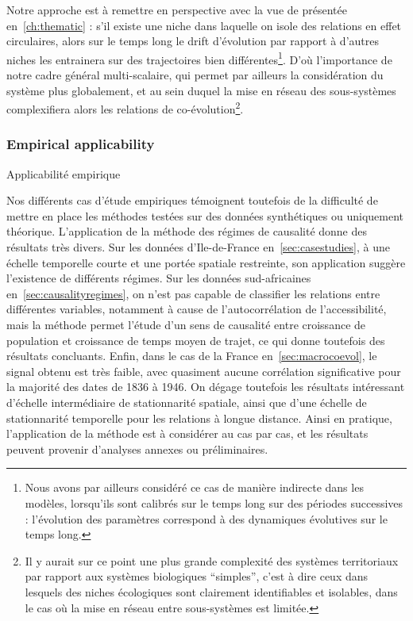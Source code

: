 Notre approche est à remettre en perspective avec la vue de  présentée en~\ref{ch:thematic} : s'il existe une niche dans laquelle on isole des relations en effet circulaires, alors sur le temps long le drift d'évolution par rapport à d'autres niches les entrainera sur des trajectoires bien différentes\footnote{Nous avons par ailleurs considéré ce cas de manière indirecte dans les modèles, lorsqu'ils sont calibrés sur le temps long sur des périodes successives : l'évolution des paramètres correspond à des dynamiques évolutives sur le temps long.}. D'où l'importance de notre cadre général multi-scalaire, qui permet par ailleurs la considération du système plus globalement, et au sein duquel la mise en réseau des sous-systèmes complexifiera alors les relations de co-évolution\footnote{Il y aurait sur ce point une plus grande complexité des systèmes territoriaux par rapport aux systèmes biologiques ``simples'', c'est à dire ceux dans lesquels des niches écologiques sont clairement identifiables et isolables, dans le cas où la mise en réseau entre sous-systèmes est limitée.}.





\subsubsection{Empirical applicability}{Applicabilité empirique}

Nos différents cas d'étude empiriques témoignent toutefois de la difficulté de mettre en place les méthodes testées sur des données synthétiques ou uniquement théorique. L'application de la méthode des régimes de causalité donne des résultats très divers. Sur les données d'Ile-de-France en~\ref{sec:casestudies}, à une échelle temporelle courte et une portée spatiale restreinte, son application suggère l'existence de différents régimes. Sur les données sud-africaines en~\ref{sec:causalityregimes}, on n'est pas capable de classifier les relations entre différentes variables, notamment à cause de l'autocorrélation de l'accessibilité, mais la méthode permet l'étude d'un sens de causalité entre croissance de population et croissance de temps moyen de trajet, ce qui donne toutefois des résultats concluants. Enfin, dans le cas de la France en~\ref{sec:macrocoevol}, le signal obtenu est très faible, avec quasiment aucune corrélation significative pour la majorité des dates de 1836 à 1946. On dégage toutefois les résultats intéressant d'échelle intermédiaire de stationnarité spatiale, ainsi que d'une échelle de stationnarité temporelle pour les relations à longue distance. Ainsi en pratique, l'application de la méthode est à considérer au cas par cas, et les résultats peuvent provenir d'analyses annexes ou préliminaires.


